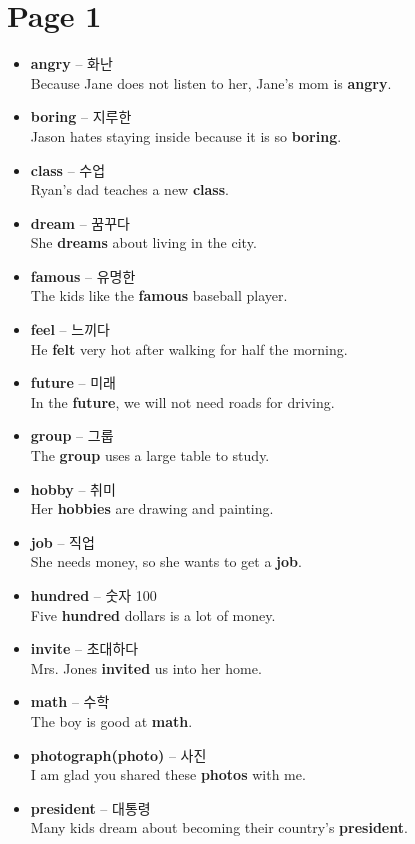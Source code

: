 \documentclass[12pt]{article}
\begin{document}
\section*{Page 1}
\begin{itemize}
    \item \textbf{angry} -- 화난 \\
    Because Jane does not listen to her, Jane's mom is \textbf{angry}.
    \item \textbf{boring} -- 지루한 \\
    Jason hates staying inside because it is so \textbf{boring}.
    \item \textbf{class} -- 수업 \\
    Ryan's dad teaches a new \textbf{class}.
    \item \textbf{dream} -- 꿈꾸다 \\
    She \textbf{dreams} about living in the city.
    \item \textbf{famous} -- 유명한 \\
    The kids like the \textbf{famous} baseball player.
    \item \textbf{feel} -- 느끼다 \\
    He \textbf{felt} very hot after walking for half the morning.
    \item \textbf{future} -- 미래 \\
    In the \textbf{future}, we will not need roads for driving.
    \item \textbf{group} -- 그룹 \\
    The \textbf{group} uses a large table to study.
    \item \textbf{hobby} -- 취미 \\
    Her \textbf{hobbies} are drawing and painting.
    \item \textbf{job} -- 직업 \\
    She needs money, so she wants to get a \textbf{job}.
    \item \textbf{hundred} -- 숫자 100 \\
    Five \textbf{hundred} dollars is a lot of money.
    \item \textbf{invite} -- 초대하다 \\
    Mrs. Jones \textbf{invited} us into her home.
    \item \textbf{math} -- 수학 \\
    The boy is good at \textbf{math}.
    \item \textbf{photograph(photo)} -- 사진 \\
    I am glad you shared these \textbf{photos} with me.
    \item \textbf{president} -- 대통령 \\
    Many kids dream about becoming their country's \textbf{president}.
\end{itemize}
\end{document}
